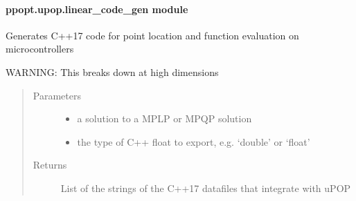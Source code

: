 \documentclass[letterpaper,10pt,english]{sphinxmanual}
\begin{document}
\paragraph{ppopt.upop.linear\_code\_gen module}
\label{\detokenize{ppopt.upop:module-ppopt.upop.linear_code_gen}}\label{\detokenize{ppopt.upop:ppopt-upop-linear-code-gen-module}}

\begin{fulllineitems}
\label{\detokenize{ppopt.upop:ppopt.upop.linear_code_gen.generate_code_cpp}}
\sphinxAtStartPar
Generates C++17 code for point location and function evaluation on microcontrollers

\sphinxAtStartPar
WARNING: This breaks down at high dimensions
\begin{quote}\begin{description}
\item[{Parameters}] \leavevmode\begin{itemize}
\item {} 
\sphinxAtStartPar
{} \textendash{} a solution to a MPLP or MPQP solution

\item {} 
\sphinxAtStartPar
{} \textendash{} the type of C++ float to export, e.g. ‘double’ or ‘float’

\end{itemize}

\item[{Returns}] \leavevmode
\sphinxAtStartPar
List of the strings of the C++17 datafiles that integrate with uPOP

\end{description}\end{quote}

\end{fulllineitems}
\end{document}
